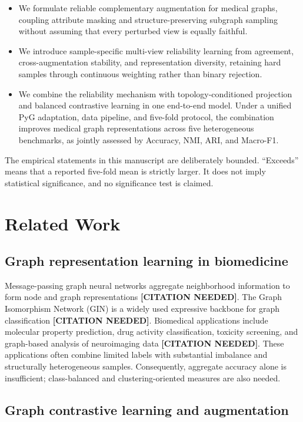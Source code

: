 \documentclass[10pt,twocolumn]{article}
\newcommand{\citeneeded}{\textbf{[CITATION NEEDED]}}
\begin{document}
\begin{itemize}[leftmargin=*,nosep]
    \item We formulate reliable complementary augmentation for medical graphs, coupling attribute masking and structure-preserving subgraph sampling without assuming that every perturbed view is equally faithful.
    \item We introduce sample-specific multi-view reliability learning from agreement, cross-augmentation stability, and representation diversity, retaining hard samples through continuous weighting rather than binary rejection.
    \item We combine the reliability mechanism with topology-conditioned projection and balanced contrastive learning in one end-to-end model. Under a unified PyG adaptation, data pipeline, and five-fold protocol, the combination improves medical graph representations across five heterogeneous benchmarks, as jointly assessed by Accuracy, NMI, ARI, and Macro-F1.
\end{itemize}

The empirical statements in this manuscript are deliberately bounded. ``Exceeds'' means that a reported five-fold mean is strictly larger. It does not imply statistical significance, and no significance test is claimed.

\section{Related Work}

\subsection{Graph representation learning in biomedicine}

Message-passing graph neural networks aggregate neighborhood information to form node and graph representations \citeneeded. The Graph Isomorphism Network (GIN) is a widely used expressive backbone for graph classification \citeneeded. Biomedical applications include molecular property prediction, drug activity classification, toxicity screening, and graph-based analysis of neuroimaging data \citeneeded. These applications often combine limited labels with substantial imbalance and structurally heterogeneous samples. Consequently, aggregate accuracy alone is insufficient; class-balanced and clustering-oriented measures are also needed.

\subsection{Graph contrastive learning and augmentation}
\end{document}
